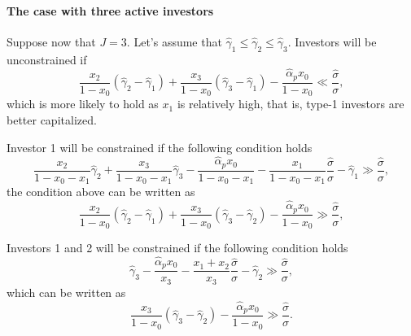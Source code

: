 \paragraph{The case with three active investors} Suppose now that $J = 3$. Let's assume that $\hat{\gamma}_1\leq \hat{\gamma}_2\leq \hat{\gamma}_3$. Investors will be unconstrained if 
\begin{equation}
    \frac{x_2}{1-x_0} (\hat{\gamma}_2-\hat{\gamma}_1) + \frac{x_3}{1-x_0} (\hat{\gamma}_3-\hat{\gamma}_1)  - \frac{\hat{\alpha}_p x_0}{1-x_0} \ll \frac{\hat{\sigma}}{\sigma},
\end{equation}
which is more likely to hold as $x_1$ is relatively high, that is, type-1 investors are better capitalized.

Investor 1 will be constrained if the following condition holds
\begin{equation}
    \frac{x_2}{1-x_0-x_1} \hat{\gamma}_2 + \frac{x_3}{1-x_0-x_1} \hat{\gamma}_3 - \frac{\hat{\alpha}_p x_0}{1-x_0 - x_1} - \frac{x_1}{1-x_0-x_1} \frac{\hat{\sigma}}{\sigma} - \hat{\gamma}_1 \gg \frac{\hat{\sigma}}{\sigma},
\end{equation}
the condition above can be written as
\begin{equation}
    \frac{x_2}{1-x_0} (\hat{\gamma}_2-\hat{\gamma}_1) + \frac{x_3}{1-x_0} (\hat{\gamma}_3-\hat{\gamma}_2) - \frac{\hat{\alpha}_p x_0}{1-x_0 } \gg \frac{\hat{\sigma}}{\sigma},
\end{equation}

Investors 1 and 2 will be constrained if the following condition holds
\begin{equation}
     \hat{\gamma}_3 - \frac{\hat{\alpha}_p x_0}{x_3} - \frac{x_1+x_2}{x_3} \frac{\hat{\sigma}}{\sigma} - \hat{\gamma}_2 \gg \frac{\hat{\sigma}}{\sigma},
\end{equation}
which can be written as
\begin{equation}
    \frac{x_3}{1-x_0} (\hat{\gamma}_3 -\hat{\gamma}_2) - \frac{\hat{\alpha}_p x_0}{1-x_0} \gg \frac{\hat{\sigma}}{\sigma}.
\end{equation}

